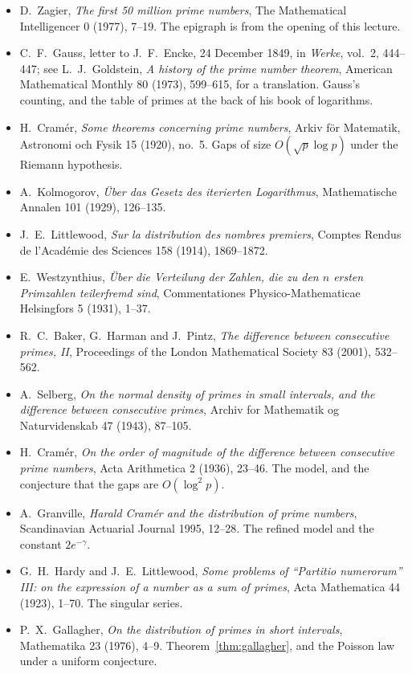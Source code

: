 \begin{itemize}
\item D.~Zagier, \emph{The first 50 million prime numbers}, The Mathematical Intelligencer 0 (1977), 7--19. The epigraph is from the opening of this lecture.
\item C.~F.~Gauss, letter to J.~F.~Encke, 24 December 1849, in \emph{Werke}, vol.~2, 444--447; see L.~J.~Goldstein, \emph{A history of the prime number theorem}, American Mathematical Monthly 80 (1973), 599--615, for a translation. Gauss's counting, and the table of primes at the back of his book of logarithms.
\item H.~Cramér, \emph{Some theorems concerning prime numbers}, Arkiv för Matematik, Astronomi och Fysik 15 (1920), no.~5. Gaps of size $O(\sqrt p\log p)$ under the Riemann hypothesis.
\item A.~Kolmogorov, \emph{Über das Gesetz des iterierten Logarithmus}, Mathematische Annalen 101 (1929), 126--135.
\item J.~E.~Littlewood, \emph{Sur la distribution des nombres premiers}, Comptes Rendus de l'Académie des Sciences 158 (1914), 1869--1872.
\item E.~Westzynthius, \emph{Über die Verteilung der Zahlen, die zu den $n$ ersten Primzahlen teilerfremd sind}, Commentationes Physico-Mathematicae Helsingfors 5 (1931), 1--37.
\item R.~C.~Baker, G.~Harman and J.~Pintz, \emph{The difference between consecutive primes, II}, Proceedings of the London Mathematical Society 83 (2001), 532--562.
\item A.~Selberg, \emph{On the normal density of primes in small intervals, and the difference between consecutive primes}, Archiv for Mathematik og Naturvidenskab 47 (1943), 87--105.
\item H.~Cramér, \emph{On the order of magnitude of the difference between consecutive prime numbers}, Acta Arithmetica 2 (1936), 23--46. The model, and the conjecture that the gaps are $O(\log^2 p)$.
\item A.~Granville, \emph{Harald Cramér and the distribution of prime numbers}, Scandinavian Actuarial Journal 1995, 12--28. The refined model and the constant $2e^{-\gamma}$.
\item G.~H.~Hardy and J.~E.~Littlewood, \emph{Some problems of ``Partitio numerorum'' III: on the expression of a number as a sum of primes}, Acta Mathematica 44 (1923), 1--70. The singular series.
\item P.~X.~Gallagher, \emph{On the distribution of primes in short intervals}, Mathematika 23 (1976), 4--9. Theorem~\ref{thm:gallagher}, and the Poisson law under a uniform conjecture.

\end{itemize}
